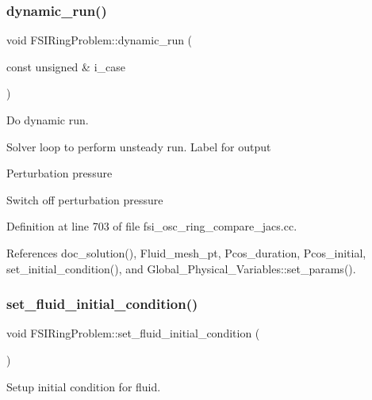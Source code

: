 \subsubsection{\texorpdfstring{dynamic\+\_\+run()}{dynamic\_run()}\hspace{0.1cm}{\footnotesize\ttfamily [2/2]}}
{\footnotesize\ttfamily void F\+S\+I\+Ring\+Problem\+::dynamic\+\_\+run (\begin{DoxyParamCaption}\item[{const unsigned \&}]{i\+\_\+case }\end{DoxyParamCaption})}



Do dynamic run. 

Solver loop to perform unsteady run. Label for output

Perturbation pressure

Switch off perturbation pressure 

Definition at line 703 of file fsi\+\_\+osc\+\_\+ring\+\_\+compare\+\_\+jacs.\+cc.



References doc\+\_\+solution(), Fluid\+\_\+mesh\+\_\+pt, Pcos\+\_\+duration, Pcos\+\_\+initial, set\+\_\+initial\+\_\+condition(), and Global\+\_\+\+Physical\+\_\+\+Variables\+::set\+\_\+params().

\mbox{\label{classFSIRingProblem_ad397e4e3b92845240dd6a996856f33e7}} 
\subsubsection{\texorpdfstring{set\+\_\+fluid\+\_\+initial\+\_\+condition()}{set\_fluid\_initial\_condition()}\hspace{0.1cm}{\footnotesize\ttfamily [1/2]}}
{\footnotesize\ttfamily void F\+S\+I\+Ring\+Problem\+::set\+\_\+fluid\+\_\+initial\+\_\+condition (\begin{DoxyParamCaption}{ }\end{DoxyParamCaption})\hspace{0.3cm}{\ttfamily [private]}}



Setup initial condition for fluid. 

